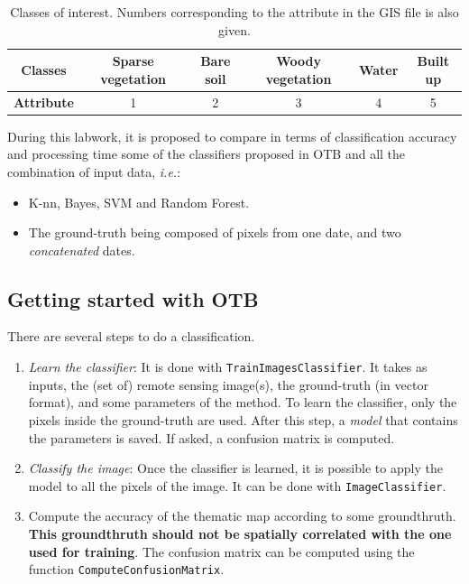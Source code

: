\documentclass[a4paper,11pt,DIV=18]{scrartcl}
\begin{document}
\begin{table}[htb]
\caption{\label{tab:orgtable9}
Classes of interest. Numbers corresponding to the attribute in the GIS file is also given.}
\centering
\begin{tabular}{cccccc}
\toprule
\textbf{Classes} & Sparse vegetation & Bare soil & Woody vegetation & Water & Built up\\
\midrule
\textbf{Attribute} & 1 & 2 & 3 & 4 & 5\\
\bottomrule
\end{tabular}
\end{table}

During  this  labwork,   it  is  proposed  to  compare   in  terms  of
classification accuracy  and processing  time some of  the classifiers
proposed in OTB and all the combination of input data, \emph{i.e.}:
\begin{itemize}
\item K-nn, Bayes, SVM and Random Forest.
\item The ground-truth  being composed  of pixels from  one date,  and two
\emph{concatenated} dates.
\end{itemize}
\subsection{Getting started with OTB}
\label{sec:orgheadline28}
There are several steps to do a classification.
\begin{enumerate}
\item \emph{Learn   the    classifier}:   It    is   done    with
\texttt{TrainImagesClassifier}.   It takes  as inputs,  the (set  of) remote
sensing  image(s), the  ground-truth (in  vector format),  and some
parameters of the method.  To learn the classifier, only the pixels
inside the  ground-truth are  used. After this  step, a  \emph{model} that
contains the parameters  is saved. If asked, a  confusion matrix is
computed.
\item \emph{Classify the image}: Once the  classifier is learned, it is possible
to apply the model to all the  pixels of the image.  It can be done
with \texttt{ImageClassifier}.
\item Compute the  accuracy of  the  thematic map  according to  some
groundthruth. \textbf{This groundthruth should  not be spatially correlated
with  the one  used  for  training}.  The  confusion  matrix can  be
computed using the function \texttt{ComputeConfusionMatrix}.
\end{enumerate}
\end{document}
